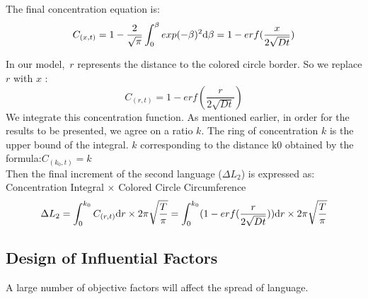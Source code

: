 \documentclass{mcmthesis}
\begin{document}
    The final concentration equation is:
    $$C_{(x,t)}=1-\frac{2}{\sqrt{\pi}}\int_0^\beta exp(-\beta)^2{\rm d}\beta=1-erf(\frac{x}{2\sqrt{Dt}})$$

    In our model,\ $r$ represents the distance to the colored circle border.
    So we replace $r$ with $x$ :
    $$C_{(r,t)}=1-erf(\frac{r}{2\sqrt{Dt}})$$
    We integrate this concentration function.
    As mentioned earlier, in order for the results to be presented, we agree on a ratio $k$.
    The ring of concentration $k$ is the upper bound of the integral.
    $k$ corresponding to the distance k0 obtained by the formula:$C_{(k_0,t)}=k$
    \\Then the final increment of the second language ($\Delta L_2$) is expressed as:
    Concentration Integral × Colored Circle Circumference
    $$\Delta L_2=\int_0^{k_0} C_{(r,t)}{\rm d}r\times 2\pi\sqrt{\frac{T}{\pi}}=\int_0^{k_0}(1-erf(\frac{r}{2\sqrt{Dt}})){\rm d}r\times 2\pi\sqrt{\frac{T}{\pi}}$$





    \subsection{Design of Influential Factors}%
    A large number of objective factors will affect the spread of language.
\end{document}
